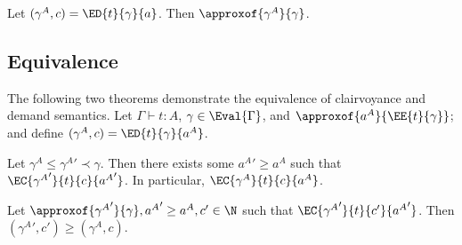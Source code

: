 \begin{lemma}\label{prop:dem-approx-eval}
  Let \( (\gamma^A, c) = \ED{t}{\gamma}{a} \).  Then \( \approxof{\gamma^A}{\gamma} \).
\end{lemma}


\subsection{Equivalence}

The following two theorems demonstrate the equivalence of clairvoyance and demand semantics. Let \( \Gamma \vdash t : A \), \( \gamma \in \Eval{\Gamma} \), and \( \approxof{a^A}{\EE{t}{\gamma}} \); and define \( (\gamma^A, c) = \ED{t}{\gamma}{a^A} \).

\begin{theorem}
  \label{prop:cost-existence}
  Let \( \gamma^A \le {\gamma^A}' \prec \gamma \).  Then there exists some \( {a^A}' \ge a^A \) such that \( \EC{{\gamma^A}'}{t}{c}{{a^A}'} \).  In particular, \( \EC{\gamma^A}{t}{c}{a^A} \).
\end{theorem}

\begin{theorem}
  \label{prop:cost-minimality}
  Let \( \approxof{{\gamma^A}'}{\gamma}, {a^A}' \ge a^A, c' \in \N \) such that \( \EC{{\gamma^A}'}{t}{c'}{{a^A}'} \). Then \( ({\gamma^A}', c') \ge (\gamma^A, c) \).
\end{theorem}
